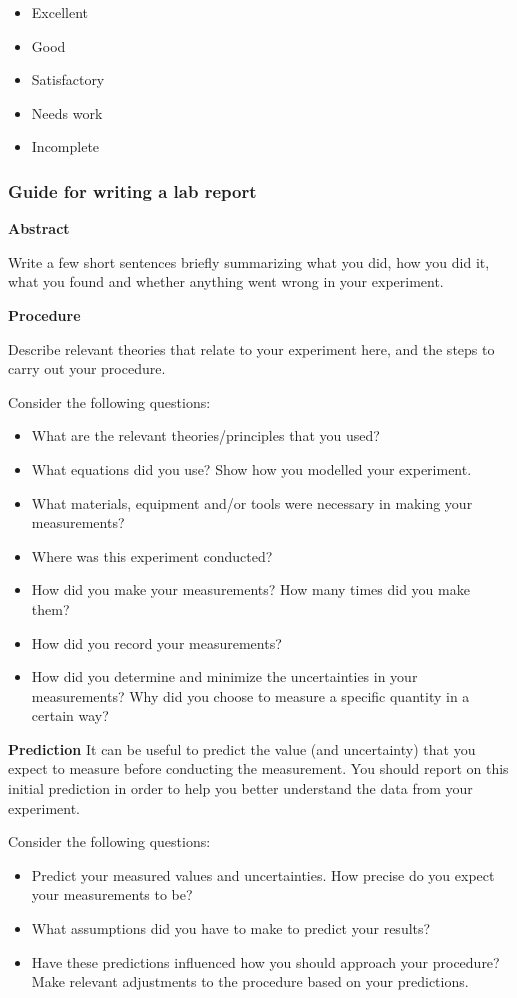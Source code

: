\begin{itemize}
\item Excellent
\item Good
\item Satisfactory
\item Needs work
\item Incomplete
\end{itemize}

\subsubsection{Guide for writing a lab report}

\textbf{Abstract}

Write a few short sentences briefly summarizing what you did, how you did it, what you found and whether anything went wrong in your experiment.

\textbf{Procedure}

Describe relevant theories that relate to your experiment here, and the steps to carry out your procedure.

Consider the following questions:

\begin{itemize}
\item What are the relevant theories/principles that you used?
\item What equations did you use? Show how you modelled your experiment.
\item What materials, equipment and/or tools were necessary in making your measurements?
\item Where was this experiment conducted?
\item How did you make your measurements? How many times did you make them?
\item How did you record your measurements?
\item How did you determine and minimize the uncertainties in your measurements? Why did you choose to measure a specific quantity in a certain way?
\end{itemize}

\textbf{Prediction}
It can be useful to predict the value (and uncertainty) that you expect to measure before conducting the measurement. You should report on this initial prediction in order to help you better understand the data from your experiment.

Consider the following questions:

\begin{itemize}
\item Predict your measured values and uncertainties. How precise do you expect your measurements to be?
\item What assumptions did you have to make to predict your results?
\item Have these predictions influenced how you should approach your procedure? Make relevant adjustments to the procedure based on your predictions.
\end{itemize}

